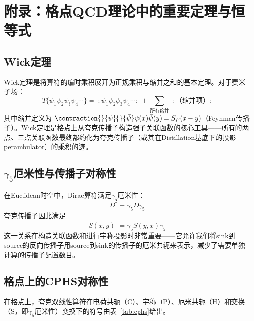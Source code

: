 \documentclass[11pt,a4paper]{ctexart}
\begin{document}
\section{附录：格点QCD理论中的重要定理与恒等式}

\subsection{Wick定理}

Wick定理是将算符的编时乘积展开为正规乘积与缩并之和的基本定理。对于费米子场：
\begin{equation}
T\{\psi_1 \bar{\psi}_2 \psi_3 \bar{\psi}_4 \cdots\} = \; :\psi_1 \bar{\psi}_2 \psi_3 \bar{\psi}_4 \cdots: \; + \sum_{\text{所有缩并}} \; :\text{（缩并项）}:
\end{equation}
其中缩并定义为 $\contraction{}{\psi}{}{\bar{\psi}} \psi(x) \bar{\psi}(y) = S_F(x-y)$（Feynman传播子）。Wick定理是格点上从夸克传播子构造强子关联函数的核心工具——所有的两点、三点关联函数最终都约化为夸克传播子（或其在Distillation基底下的投影——perambulator）的乘积的迹。

\subsection{$\gamma_5$厄米性与传播子对称性}

在Euclidean时空中，Dirac算符满足$\gamma_5$厄米性：
\begin{equation}
D^\dagger = \gamma_5 D \gamma_5
\end{equation}
夸克传播子因此满足：
\begin{equation}
S(x,y)^\dagger = \gamma_5 S(y,x) \gamma_5
\end{equation}
这一关系在构造关联函数和进行宇称投影时非常重要——它允许我们将sink到source的反向传播子用source到sink的传播子的厄米共轭来表示，减少了需要单独计算的传播子配置数目。

\subsection{格点上的CPHS对称性}

在格点上，夸克双线性算符在电荷共轭（C）、宇称（P）、厄米共轭（H）和交换（S，即$\gamma_5$厄米性）变换下的符号由表~\ref{tab:cphs}给出。
\end{document}
